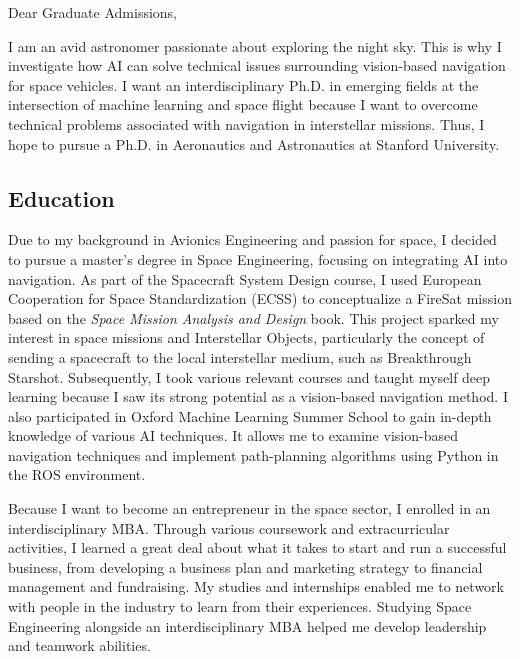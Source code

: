 \documentclass[a4,25pt]{article}
\begin{document}
\begin{large} 
Dear Graduate Admissions, \par
\vspace{-0.25cm} \quad I am an avid astronomer passionate about exploring the night sky. This is why I investigate how AI can solve technical issues surrounding vision-based navigation for space vehicles. I want an interdisciplinary Ph.D. in emerging fields at the intersection of machine learning and space flight because I want to overcome technical problems associated with navigation in interstellar missions. Thus, I hope to pursue a Ph.D. in Aeronautics and Astronautics at Stanford University. \par
\subsection{Education} \quad Due to my background in Avionics Engineering and passion for space, I decided to pursue a master's degree in Space Engineering, focusing on integrating AI into navigation. As part of the Spacecraft System Design course, I used European Cooperation for Space Standardization (ECSS) to conceptualize a FireSat mission based on the \textit{Space Mission Analysis and Design} book. This project sparked my interest in space missions and Interstellar Objects, particularly the concept of sending a spacecraft to the local interstellar medium, such as Breakthrough Starshot. Subsequently, I took various relevant courses and taught myself deep learning because I saw its strong potential as a vision-based navigation method. I also participated in Oxford Machine Learning Summer School to gain in-depth knowledge of various AI techniques. It allows me to examine vision-based navigation techniques and implement path-planning algorithms using Python in the ROS environment. \par
\vspace{-0.25cm}\quad Because I want to become an entrepreneur in the space sector, I enrolled in an interdisciplinary MBA. Through various coursework and extracurricular activities, I learned a great deal about what it takes to start and run a successful business, from developing a business plan and marketing strategy to financial management and fundraising. My studies and internships enabled me to network with people in the industry to learn from their experiences. Studying Space Engineering alongside an interdisciplinary MBA helped me develop leadership and teamwork abilities.  \par

\end{large}
\end{document}
